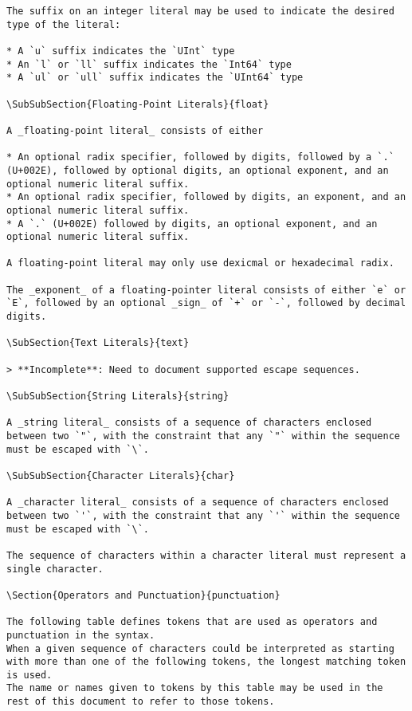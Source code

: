 \begin{verbatim}
The suffix on an integer literal may be used to indicate the desired type of the literal:

* A `u` suffix indicates the `UInt` type
* An `l` or `ll` suffix indicates the `Int64` type
* A `ul` or `ull` suffix indicates the `UInt64` type

\SubSubSection{Floating-Point Literals}{float}

A _floating-point literal_ consists of either

* An optional radix specifier, followed by digits, followed by a `.` (U+002E), followed by optional digits, an optional exponent, and an optional numeric literal suffix.
* An optional radix specifier, followed by digits, an exponent, and an optional numeric literal suffix.
* A `.` (U+002E) followed by digits, an optional exponent, and an optional numeric literal suffix.

A floating-point literal may only use dexicmal or hexadecimal radix.

The _exponent_ of a floating-pointer literal consists of either `e` or `E`, followed by an optional _sign_ of `+` or `-`, followed by decimal digits.

\SubSection{Text Literals}{text}

> **Incomplete**: Need to document supported escape sequences.

\SubSubSection{String Literals}{string}

A _string literal_ consists of a sequence of characters enclosed between two `"`, with the constraint that any `"` within the sequence must be escaped with `\`.

\SubSubSection{Character Literals}{char}

A _character literal_ consists of a sequence of characters enclosed between two `'`, with the constraint that any `'` within the sequence must be escaped with `\`.

The sequence of characters within a character literal must represent a single character.

\Section{Operators and Punctuation}{punctuation}

The following table defines tokens that are used as operators and punctuation in the syntax.
When a given sequence of characters could be interpreted as starting with more than one of the following tokens, the longest matching token is used.
The name or names given to tokens by this table may be used in the rest of this document to refer to those tokens.


\end{verbatim}
